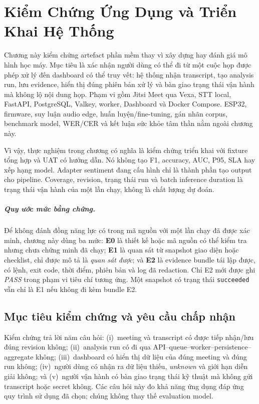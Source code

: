 \chapter{Kiểm Chứng Ứng Dụng và Triển Khai Hệ Thống}
\label{chap:experiments}

Chương này kiểm chứng artefact phần mềm thay vì xây dựng hay đánh giá mô hình học máy. Mục tiêu là xác nhận người dùng có thể đi từ một cuộc họp được phép xử lý đến dashboard có thể truy vết: hệ thống nhận transcript, tạo analysis run, lưu evidence, hiển thị đúng phiên bản xử lý và bàn giao trạng thái vận hành mà không lộ nội dung họp. Phạm vi gồm Jitsi Meet qua Vexa, STT local, FastAPI, PostgreSQL, Valkey, worker, Dashboard và Docker Compose. ESP32, firmware, suy luận audio edge, huấn luyện/fine-tuning, gán nhãn corpus, benchmark model, WER/CER và kết luận sức khỏe tâm thần nằm ngoài chương này.

Vì vậy, thực nghiệm trong chương có nghĩa là kiểm chứng triển khai với fixture tổng hợp và UAT có hướng dẫn. Nó không tạo F1, accuracy, AUC, P95, SLA hay xếp hạng model. Adapter sentiment đang cấu hình chỉ là thành phần tạo output cho pipeline. Coverage, revision, trạng thái run và batch inference duration là trạng thái vận hành của một lần chạy, không là chất lượng dự đoán.

\paragraph{Quy ước mức bằng chứng.} Để không đánh đồng năng lực có trong mã nguồn với một lần chạy đã được xác minh, chương này dùng ba mức: \textbf{E0} là thiết kế hoặc mã nguồn có thể kiểm tra nhưng chưa chứng minh đã chạy; \textbf{E1} là quan sát từ snapshot giao diện hoặc checklist, chỉ được mô tả là \emph{quan sát được}; và \textbf{E2} là evidence bundle tái lập được, có lệnh, exit code, thời điểm, phiên bản và log đã redaction. Chỉ E2 mới được ghi \emph{PASS} trong phạm vi tiêu chí tương ứng. Một snapshot có trạng thái \texttt{succeeded} vẫn chỉ là E1 nếu không đi kèm bundle E2.

\section{Mục tiêu kiểm chứng và yêu cầu chấp nhận}

Kiểm chứng trả lời năm câu hỏi: (i)~meeting và transcript có được tiếp nhận/lưu đúng revision không; (ii)~analysis run có đi qua API--queue--worker--persistence--aggregate không; (iii)~dashboard có hiển thị dữ liệu của đúng meeting và đúng run không; (iv)~người dùng có nhận ra dữ liệu thiếu, \textit{unknown} và giới hạn diễn giải không; và (v)~người vận hành có bàn giao trạng thái kỹ thuật mà không gửi transcript hoặc secret không. Các câu hỏi này đo khả năng ứng dụng đáp ứng quy trình sử dụng đã chọn; chúng không thay thế evaluation model.

